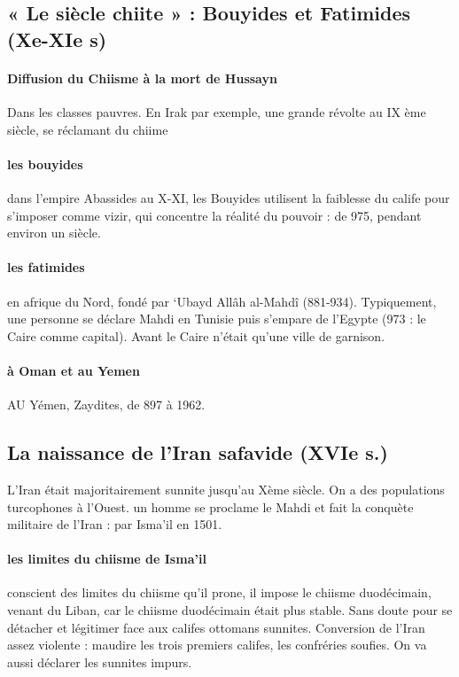  
 
 \subsection{ « Le siècle chiite » : Bouyides et Fatimides (Xe-XIe s)}
 
 
 \paragraph{Diffusion du Chiisme à la mort de Hussayn} Dans les classes pauvres. En Irak par exemple, une grande révolte au IX ème siècle, se réclamant du chiime
 
 \paragraph{les bouyides} dans l'empire Abassides au X-XI, les Bouyides utilisent la faiblesse du calife pour s'imposer comme vizir, qui concentre la réalité du pouvoir : de 975, pendant environ un siècle.  
 
 
 
 \paragraph{les fatimides} en afrique du Nord, fondé  par `Ubayd Allâh al-Mahdî (881-934). Typiquement, une personne se déclare Mahdi en Tunisie puis s'empare de l'Egypte (973 : le Caire comme capital). Avant le Caire n'était qu'une ville de garnison. 
 
 \paragraph{à Oman et au Yemen} AU Yémen, Zaydites, de 897 à 1962.
 
 
 
  \subsection{La naissance de l'Iran safavide (XVIe s.)}
 
 L'Iran était majoritairement sunnite jusqu'au Xème siècle. On a des populations turcophones à l'Ouest. un homme se proclame le Mahdi et fait la conquète militaire de l'Iran : par Isma'il en 1501.
  
 \paragraph{les limites du chiisme de Isma'il} conscient des limites du chiisme qu'il prone, il impose le chiisme duodécimain, venant du Liban, car le chiisme duodécimain était plus stable. Sans doute pour se détacher et légitimer face aux califes ottomans sunnites. Conversion de l'Iran assez violente : maudire les trois premiers califes, les confréries soufies. On va aussi déclarer les sunnites impurs.  


